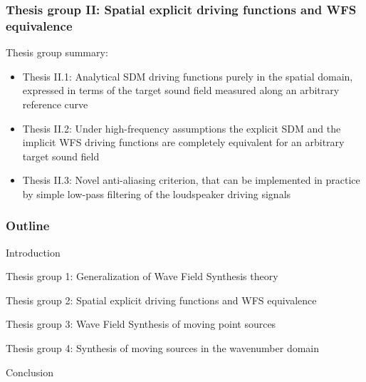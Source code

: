 \documentclass{beamer}
\begin{document}
\begin{frame}
\frametitle{Thesis group II: Spatial explicit driving functions and WFS equivalence}
Thesis group summary:
	\vspace{3mm}
	\begin{itemize}
	\item Thesis II.1: Analytical SDM driving functions purely in the spatial domain, expressed in terms of the target sound field measured along an arbitrary reference curve	\vspace{3mm}
	\item Thesis II.2: Under high-frequency assumptions the explicit SDM and the implicit WFS driving functions are completely equivalent for an arbitrary target sound field	\vspace{3mm}
	\item Thesis II.3: Novel anti-aliasing criterion, that can be implemented in practice by simple low-pass filtering of the loudspeaker driving signals
	\end{itemize}
\end{frame}
	
\begin{frame}
\frametitle{Outline}
\begin{itemize}
	\item Introduction \vspace{3mm}
	\item Thesis group 1: Generalization of Wave Field Synthesis theory \vspace{3mm}
	\item Thesis group 2: Spatial explicit driving functions and WFS equivalence\vspace{3mm}
	\item {\color{blue} Thesis group 3: Wave Field Synthesis of moving point sources \vspace{3mm}
	\item Thesis group 4: Synthesis of moving sources in the wavenumber domain \vspace{3mm}} 
	\item Conclusion
\end{itemize}
\end{frame}
\end{document}
